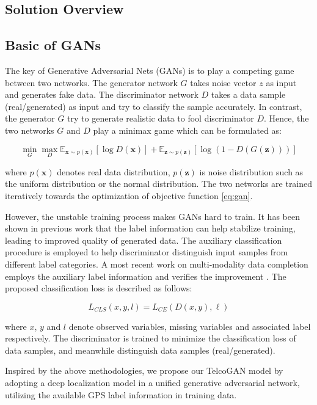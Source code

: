 \subsection{Solution Overview}


\subsection{Basic of GANs}
The key of Generative Adversarial Nets (GANs) \cite{DBLP:conf/nips/GoodfellowPMXWOCB14} is to play a competing game between two networks. The generator network $G$ takes noise vector $z$ as input and generates fake data. The discriminator network $D$ takes a data sample (real/generated) as input and try to classify the sample accurately. In contrast, the generator $G$ try to generate realistic data to fool discriminator $D$. Hence, the two networks $G$ and $D$ play a minimax game which can be formulated as:

\begin{equation}\label{eq:gan}
  \min\limits_G \max\limits_D \mathbb{E}_{\textbf{x}\sim p(\textbf{x})}[\log D(\textbf{x})]+\mathbb{E}_{\textbf{z}\sim p( \textbf{z})}[\log(1-D(G(\textbf{z})))]
\end{equation}

where $p(\textbf{x})$ denotes real data distribution, $p(\textbf{z})$ is noise distribution such as the uniform distribution or the normal distribution. The two networks are trained iteratively towards the optimization of objective function \ref{eq:gan}.

However, the unstable training process makes GANs hard to train. It has been shown in previous work \cite{DBLP:conf/icml/OdenaOS17} that the label information can help stabilize training, leading to improved quality of generated data. The auxiliary classification procedure is employed to help discriminator distinguish input samples from different label categories. A most recent work on multi-modality data completion employs the auxiliary label information and verifies the improvement \cite{DBLP:conf/kdd/CaiWGSJ18}. The proposed classification loss is described as follows:

\begin{equation}\label{eq:multi}
  L_{CLS}(x, y, l)=L_{CE}(D(x,y),\ell)
\end{equation}

where $x$, $y$ and $l$ denote observed variables, missing variables and associated label respectively. The discriminator is trained to minimize the classification loss of data samples, and meanwhile distinguish data samples (real/generated).

Inspired by the above methodologies, we propose our TelcoGAN model by adopting a deep localization model in a unified generative adversarial network, utilizing the available GPS label information in training data.
